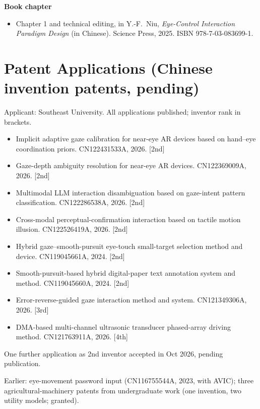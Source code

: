 \documentclass[10pt,a4paper]{article}
\begin{document}
\textbf{Book chapter}
\begin{itemize}
  \item Chapter 1 and technical editing, in Y.-F.~Niu, \textit{Eye-Control Interaction Paradigm Design} (in Chinese). Science Press, 2025. ISBN 978-7-03-083699-1.
\end{itemize}

\section{Patent Applications (Chinese invention patents, pending)}
{\small\color{muted} Applicant: Southeast University. All applications published; inventor rank in brackets.}
\begin{itemize}
  \item Implicit adaptive gaze calibration for near-eye AR devices based on hand--eye coordination priors. CN122431533A, 2026. [2nd]
  \item Gaze-depth ambiguity resolution for near-eye AR devices. CN122369009A, 2026. [2nd]
  \item Multimodal LLM interaction disambiguation based on gaze-intent pattern classification. CN122286538A, 2026. [2nd]
  \item Cross-modal perceptual-confirmation interaction based on tactile motion illusion. CN122526419A, 2026. [2nd]
  \item Hybrid gaze--smooth-pursuit eye-touch small-target selection method and device. CN119045661A, 2024. [2nd]
  \item Smooth-pursuit-based hybrid digital-paper text annotation system and method. CN119045660A, 2024. [2nd]
  \item Error-reverse-guided gaze interaction method and system. CN121349306A, 2026. [3rd]
  \item DMA-based multi-channel ultrasonic transducer phased-array driving method. CN121763911A, 2026. [4th]
\end{itemize}
{\small One further application as 2nd inventor accepted in Oct 2026, pending publication.}\par
{\small Earlier: eye-movement password input (CN116755544A, 2023, with AVIC); three agricultural-machinery patents from undergraduate work (one invention, two utility models; granted).}

\end{document}
